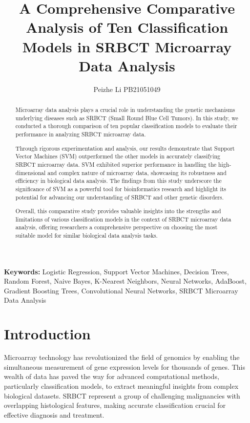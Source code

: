 \documentclass{article}
\title{A Comprehensive Comparative Analysis of Ten Classification Models in SRBCT Microarray Data Analysis}
\author{Peizhe Li  PB21051049}
\begin{document}
\maketitle

\begin{abstract}
Microarray data analysis plays a crucial role in understanding the genetic mechanisms underlying diseases such as SRBCT (Small Round Blue Cell Tumors). In this study, we conducted a thorough comparison of ten popular classification models to evaluate their performance in analyzing SRBCT microarray data.

Through rigorous experimentation and analysis, our results demonstrate that Support Vector Machines (SVM) outperformed the other models in accurately classifying SRBCT microarray data. SVM exhibited superior performance in handling the high-dimensional and complex nature of microarray data, showcasing its robustness and efficiency in biological data analysis. The findings from this study underscore the significance of SVM as a powerful tool for bioinformatics research and highlight its potential for advancing our understanding of SRBCT and other genetic disorders.

Overall, this comparative study provides valuable insights into the strengths and limitations of various classification models in the context of SRBCT microarray data analysis, offering researchers a comprehensive perspective on choosing the most suitable model for similar biological data analysis tasks.
\end{abstract}

\textbf{Keywords:} Logistic Regression, Support Vector Machines, Decision Trees, Random Forest, Naive Bayes, K-Nearest Neighbors, Neural Networks, AdaBoost, Gradient Boosting Trees, Convolutional Neural Networks, SRBCT Microarray Data Analysis

\section{Introduction}

Microarray technology has revolutionized the field of genomics by enabling the simultaneous measurement of gene expression levels for thousands of genes. This wealth of data has paved the way for advanced computational methods, particularly classification models, to extract meaningful insights from complex biological datasets. SRBCT represent a group of challenging malignancies with overlapping histological features, making accurate classification crucial for effective diagnosis and treatment.
\end{document}
